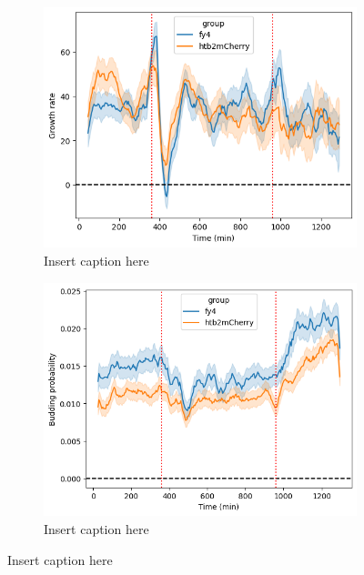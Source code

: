 \begin{figure}
  \centering
  \begin{subfigure}[htpb]{0.7\textwidth}
   \centering
   \includegraphics[width=\textwidth]{allstrains_613_gr}
   \caption{
     Insert caption here
   }
   \label{fig:biology-kdeficient-gr}
  \end{subfigure}

  \begin{subfigure}[htpb]{0.7\textwidth}
   \centering
   \includegraphics[width=\textwidth]{allstrains_613_budprob}
   \caption{
     Insert caption here
   }
   \label{fig:biology-kdeficient-budprob}
  \end{subfigure}

  \caption{
    Insert caption here
  }
  \label{fig:biology-kdeficient-gr-budprob}
\end{figure}



